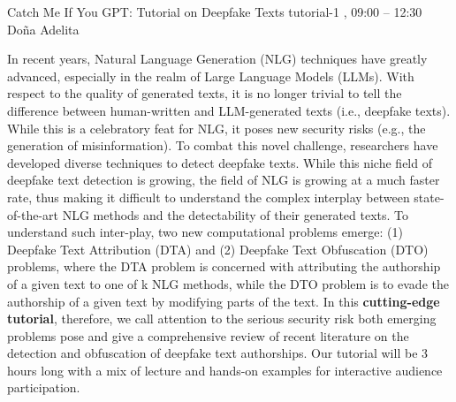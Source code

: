 %
\clearpage
\begin{tutorial}
  {Catch Me If You GPT: Tutorial on Deepfake Texts}
  {tutorial-1}
  {\daydateyear, 09:00 -- 12:30}
  {Do\~na Adelita}

In recent years, Natural Language Generation (NLG) techniques have greatly advanced, especially in the realm of Large Language Models (LLMs). With respect to the quality of generated texts, it is no longer trivial to tell the difference between human-written and LLM-generated texts (i.e., deepfake texts). While this is a celebratory feat for NLG, it poses new security risks (e.g., the generation of misinformation). To combat this novel challenge, researchers have developed diverse techniques to detect deepfake texts. While this niche field of deepfake text detection is growing, the field of NLG is growing at a much faster rate, thus making it difficult to understand the complex interplay between state-of-the-art NLG methods and the detectability of their generated texts. To understand such inter-play, two new computational problems emerge: (1) Deepfake Text Attribution (DTA) and (2) Deepfake Text Obfuscation (DTO) problems, where the DTA problem is concerned with attributing the authorship of a given text to one of k NLG methods, while the DTO problem is to evade the authorship of a given text by modifying parts of the text. In this \textbf{cutting-edge tutorial}, therefore, we call attention to the serious security risk both emerging problems pose and give a comprehensive review of recent literature on the detection and obfuscation of deepfake text authorships. Our tutorial will be 3 hours long with a mix of lecture and hands-on examples for interactive audience participation.

\end{tutorial}
